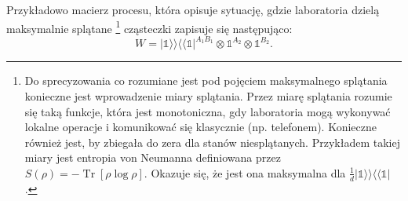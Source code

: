 \documentclass[10pt]{article} %
\DeclareMathOperator{\Trs}{Tr}
\newcommand{\Ket}[1]{|#1\rangle}
\newcommand{\Bra}[1]{\langle#1|}
\newcommand{\BBra}[1]{\langle\langle#1|}
\newcommand{\KKet}[1]{|#1\rangle\rangle}
\newcommand{\KP}{\Ket{\psi}}
\newcommand{\BP}{\Bra{\psi}}
\newcommand{\I}{\mathbb{1}}
\begin{document}
Przykładowo macierz procesu, która opisuje sytuację, gdzie laboratoria dzielą maksymalnie splątane
\footnote{Do sprecyzowania co rozumiane jest pod pojęciem maksymalnego splątania konieczne jest wprowadzenie miary splątania. Przez miarę splątania rozumie się taką funkcje, która jest monotoniczna, gdy laboratoria mogą wykonywać lokalne operacje i komunikować się klasycznie (np. telefonem). Konieczne również jest, by zbiegała do zera dla stanów niesplątanych. Przykładem takiej miary jest entropia von Neumanna definiowana przez $S(\rho) = -\Trs \left[ \rho \log \rho \right]$. Okazuje się, że jest ona maksymalna dla $\frac{1}{d}\KKet{\I}\BBra{\I}$ \cite{review}.
}
 cząsteczki zapisuje się następująco:
\begin{equation}
W = \KKet{\I}\BBra{\I}^{A_1B_1} \otimes \I^{A_2} \otimes \I^{B_2}.
\end{equation}
\end{document}
